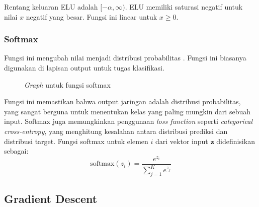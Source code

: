 Rentang keluaran ELU adalah \([-\alpha, \infty)\). ELU memiliki saturasi negatif untuk nilai \(x\) negatif yang besar. Fungsi ini linear untuk \(x \geq 0\).

\subsubsection{Softmax}

Fungsi ini mengubah nilai menjadi distribusi probabilitas \cite{bishop_2006}. Fungsi ini biasanya digunakan di lapisan output untuk tugas klasifikasi.
\begin{figure}[H]
    \centering
    \caption{\textit{Graph} untuk fungsi softmax}
    \label{fig:enter-label}
\end{figure}
Fungsi ini memastikan bahwa output jaringan adalah distribusi probabilitas, yang sangat berguna untuk menentukan kelas yang paling mungkin dari sebuah input. Softmax juga memungkinkan penggunaan \textit{loss function} seperti \textit{categorical cross-entropy}, yang menghitung kesalahan antara distribusi prediksi dan distribusi target. Fungsi softmax untuk elemen \( i \) dari vektor input \( \mathbf{z} \) didefinisikan sebagai:
\begin{equation}
    \text{softmax}(z_i) = \frac{e^{z_i}}{\sum_{j=1}^{K} e^{z_j}}
\end{equation}

\subsection{Gradient Descent}


